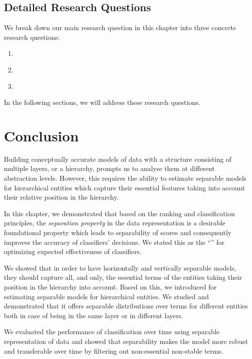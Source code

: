 \subsection{Detailed Research Questions}
We break down our main research question in this chapter into three concrete research questions:
\begin{resqbox}
\begin{enumerate}
\item[\textbf{\resqname{c3.1}}] \emph{}
\item[\textbf{\resqname{c3.2}}] \emph{}
\item[\textbf{\resqname{c3.3}}] \emph{}
\end{enumerate}
\end{resqbox}
In the following sections, we will address these research questions.







\section{Conclusion}
Building conceptually accurate models of data with a structure consisting of multiple layers, or a hierarchy, prompts us to analyse them at different abstraction levels.  However, this requires the ability to estimate separable models for hierarchical entities which capture their essential features taking into account their relative position in the hierarchy. 

In this chapter, we demonstrated that based on the ranking and classification principles, the \emph{separation property} in the data representation is a desirable foundational property which leads to separability of scores and consequently improves the accuracy of classifiers' decisions.  We stated this as the ``\ssp'' for optimizing expected effectiveness of classifiers.

We showed that in order to have horizontally and vertically separable models, they should capture all, and only, the essential terms of the entities taking their position in the hierarchy into account. Based on this, we introduced \hswlms for estimating separable models for hierarchical entities. We studied \achswlm and demonstrated that it offers separable distributions over terms for different entities both in case of being in the same layer or in different layers. 

We evaluated the performance of classification over time using separable representation of data and showed that separability makes the model more robust and transferable over time by filtering out non-essential non-stable terms.